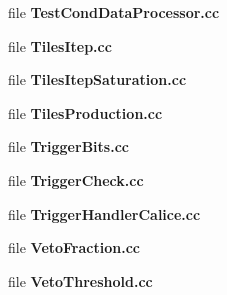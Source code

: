 \begin{DoxyCompactItemize}
\item 
file {\bfseries Test\-Cond\-Data\-Processor.\-cc}
\item 
file {\bfseries Tiles\-Itep.\-cc}
\item 
file {\bfseries Tiles\-Itep\-Saturation.\-cc}
\item 
file {\bfseries Tiles\-Production.\-cc}
\item 
file {\bfseries Trigger\-Bits.\-cc}
\item 
file {\bfseries Trigger\-Check.\-cc}
\item 
file {\bfseries Trigger\-Handler\-Calice.\-cc}
\item 
file {\bfseries Veto\-Fraction.\-cc}
\item 
file {\bfseries Veto\-Threshold.\-cc}
\end{DoxyCompactItemize}

